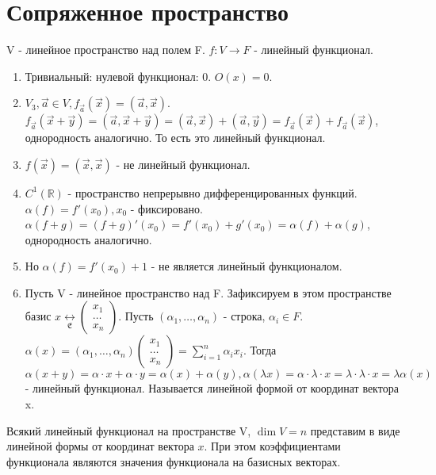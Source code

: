 \section{Сопряженное пространство}
V - линейное пространство над полем F. \(f: V\to F\) - линейный функционал.
\begin{example}
	\begin{enumerate}
		\item Тривиальный: нулевой функционал: 0. \(O(x) = 0\).
		\item \(V_3, \vec a\in V, f_{\vec a}(\vec x) = (\vec a, \vec x)\). \(f_{\vec a}(\vec x+ \vec y) = (\vec a, \vec x+ \vec y) = (\vec a, \vec x) + (\vec a, \vec y) = f_{\vec a}(\vec x) + f_{\vec a}(\vec x)\), однородность аналогично. То есть это линейный функционал.
		\item \(f(\vec x) = (\vec x, \vec x)\) - не линейный функционал.
		\item \(C^1(\mathbb{R})\) - пространство непрерывно дифференцированных функций. \(\alpha(f) = f'(x_0), x_0 \) - фиксировано. \(\alpha(f+g) = (f+g)'(x_0) = f'(x_0) + g'(x_0) = \alpha(f)+\alpha(g)\), однородность аналогично.
		\item Но \(\alpha(f) = f'(x_0) + 1\) - не является линейный функционалом.
		\item Пусть V - линейное пространство над F. Зафиксируем в этом пространстве базис \(x\underset{\mathfrak{E}}{\longleftrightarrow}\begin{pmatrix}
			x_1 \\ \ldots \\ x_n
		\end{pmatrix}\). Пусть \((\alpha_1,\ldots, \alpha_n)\) - строка, \(\alpha_i \in F\). \(\alpha(x) = (\alpha_1, \ldots, \alpha_n)\begin{pmatrix}
		x_1 \\ \ldots \\ x_n
		\end{pmatrix} = \sum_{i=1}^{n}\alpha_i x_i\). Тогда \(\alpha(x+y) = \alpha\cdot x + \alpha\cdot y = \alpha(x) + \alpha(y), \alpha(\lambda x) = \alpha \cdot\lambda\cdot x = \lambda\cdot\lambda\cdot x = \lambda \alpha(x)\) - линейный функционал. Называется линейной формой от координат вектора x.
	\end{enumerate}
\end{example}
\begin{proposition}
	Всякий линейный функционал на пространстве V, \(\dim V = n\) представим в виде линейной формы от координат вектора \(x\). При этом коэффициентами функционала являются значения функционала на базисных векторах.
\end{proposition}
